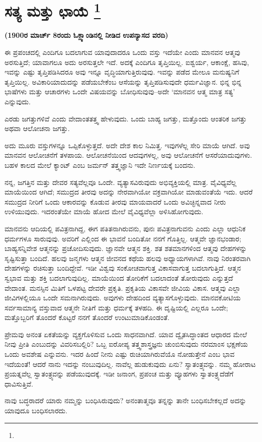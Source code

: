 
\chapter[ಸತ್ಯ ಮತ್ತು ಛಾಯೆ ]{ಸತ್ಯ ಮತ್ತು ಛಾಯೆ \protect\footnote{}}

\centerline{\textbf{(1900ರ ಮಾರ್ಚ್​ 8ರಂದು ಓಕ್ಲ್ಯಾಂಡಿನಲ್ಲಿ ನೀಡಿದ ಉಪನ್ಯಾಸದ ವರದಿ)}}

ಈ ಪ್ರಪಂಚದಲ್ಲಿ ಎಂದಿಗೂ ಬದಲಾಗುವ ಯಾವುದಾದರೂ ಒಂದು ವಸ್ತು ಇದೆಯೇ ಎಂದು ಮಾನವನ ಆತ್ಮವು ಅರಸುತ್ತಿದೆ; ಯಾವಾಗಲೂ ಅದು ಅರಸುತ್ತಲೇ ಇದೆ. ಅದಕ್ಕೆ ಎಂದಿಗೂ ತೃಪ್ತಿಯಿಲ್ಲ. ಐಶ್ವರ್ಯ, ಆಕಾಂಕ್ಷೆ, ಹಸಿವು, ಇವನ್ನು ಎಷ್ಟು ತೃಪ್ತಿಪಡಿಸಿದರೂ ಅವು ಇನ್ನೂ ವೃದ್ಧಿಯಾಗುತ್ತಿರುವುವು. ಇವನ್ನು ಪಡೆದ ಮೇಲೂ ಮನುಷ್ಯನಿಗೆ ತೃಪ್ತಿಯಿಲ್ಲ. ಅವಿಕಾರಿಯಾದುದನ್ನು ಪಡೆಯಬೇಕೆಂಬ ಆಸೆಯನ್ನು ತೃಪ್ತಿಪಡಿಸುವುದೇ ಧರ್ಮವಿಜ್ಞಾನ. ಭಿನ್ನ ಭಿನ್ನ ಭಾಷೆಗಳು ಮತ್ತು ಆಚಾರಗಳು ಒಂದೇ ವಿಷಯವನ್ನು ಬೋಧಿಸುವುವು–ಅದೇ ‘ಮಾನವನ ಆತ್ಮ ಮಾತ್ರ ಸತ್ಯ’ ಎನ್ನುವುದು.

ಎರಡು ಜಗತ್ತುಗಳಿವೆ ಎಂದು ವೇದಾಂತತತ್ತ್ವ ಹೇಳುವುದು. ಒಂದು ಬಾಹ್ಯ ಜಗತ್ತು, ಮತ್ತೊಂದು ಆಂತರಿಕ ಜಗತ್ತು ಅಥವಾ ಆಲೋಚನಾ ಜಗತ್ತು.

ಅದು ಮೂರು ವಸ್ತುಗಳನ್ನೂ ಒಪ್ಪಿಕೊಳ್ಳುತ್ತದೆ. ಅದೇ ದೇಶ ಕಾಲ ನಿಮಿತ್ತ. ಇವುಗಳೆಲ್ಲ ಸೇರಿ ಮಾಯೆ ಆಗಿದೆ. ಅವು ಮಾನವನ ಆಲೋಚನೆಗೆ ತಳಪಾಯ. ಆಲೋಚನೆಯಿಂದ ಆದವುಗಳಲ್ಲ, ಅವು ಆಲೋಚನೆಗೆ ಆಸರೆಯಾದುವುಗಳು. ಬಹಳ ಕಾಲದ ಮೇಲೆ ಕ್ಯಾಂಟ್​ ಎಂಬ ಜರ್ಮನ್​ ತತ್ತ್ವಜ್ಞಾನಿ ಇದೇ ನಿರ್ಣಯಕ್ಕೆ ಬಂದನು.

ನನ್ನ, ಜಗತ್ತಿನ ಮತ್ತು ದೇವರ ಸತ್ಯವೆಲ್ಲವೂ ಒಂದೇ. ವ್ಯತ್ಯಾಸವಿರುವುದು ಅಭಿವ್ಯಕ್ತಿಯಲ್ಲಿ ಮಾತ್ರ. ವೈವಿಧ್ಯವೆಲ್ಲ ಮಾಯೆಯಿಂದ ಆಗಿದೆ; ಸಮುದ್ರದ ತೀರವು ಅದನ್ನು ನೇರವಾಗಿಯೋ ವಕ್ರವಾಗಿಯೋ ಮಾಡುವಂತೆಯೆ ಇದು. ಆದರೆ ಸಮುದ್ರದ ನೀರಿಗೆ ಒಂದು ಆಕಾರವನ್ನು ಕೊಡುವ ತೀರವು ಮಾಯವಾದರೆ ಒಂದು ಅವಿಚ್ಛಿನ್ನವಾದ ನೀರು ಉಳಿಯುವುದು. ಇದರಂತೆಯೇ ಮಾಯೆ ಹೋದ ಮೇಲೆ ವೈವಿಧ್ಯವೆಲ್ಲಾ ಅಳಿಸಿ\break ಹೋಗುವುದು.

ಮಾನವನು ಆದಿಯಲ್ಲಿ ಪವಿತ್ರನಾಗಿದ್ದ, ಈಗ ಪತಿತನಾಗಿರುವನು, ಪುನಃ ಪವಿತ್ರನಾಗುವನು ಎಂದು ಎಲ್ಲಾ ಆಧುನಿಕ ಧರ್ಮಗಳೂ ಸಾರುವುವು. ಅವರಿಗೆ ಎಲ್ಲಿಂದ ಈ ಭಾವನೆ ಬಂದಿತೋ ನನಗೆ ಗೊತ್ತಿಲ್ಲ. ಆತ್ಮವೇ ಜ್ಞಾನಭಂಡಾರ; ಬಾಹ್ಯಸನ್ನಿವೇಶ ಆತ್ಮನನ್ನು ಪ್ರಚೋದಿಸುವುದು. ಜ್ಞಾನವೇ ಆತ್ಮನ ಶಕ್ತಿ. ಶತ ಶತಮಾನಗಳಿಂದ ಆತ್ಮವು ದೇಹಗಳನ್ನು ಸೃಷ್ಟಿಸುತ್ತಾ ಬಂದಿದೆ. ಹಲವು ಜನ್ಮಗಳು ಆತ್ಮನ ಜೀವನದ ಕಥೆಯ ಹಲವು ಅಧ್ಯಾಯಗಳಾಗಿವೆ. ನಾವು ನಿರಂತರವಾಗಿ ದೇಹಗಳನ್ನು ರಚಿಸುತ್ತಾ ಬಂದಿದ್ದೇವೆ. ಇಡೀ ವಿಶ್ವವು ಸಂಕೋಚವಾಗುತ್ತ ವಿಕಾಸವಾಗುತ್ತ ಬದಲಾಗುತ್ತಿದೆ. ಆತ್ಮನ ಸ್ವಭಾವ ಮತ್ತು ಶಕ್ತಿ ಬದಲಾಗುವುದಿಲ್ಲ. ಮಾಯೆಯಿಂದ ತೋರಿಕೆಗೆ ಬದಲಾದಂತೆ ತೋರುವುದು ಎನ್ನುತ್ತದೆ ವೇದಾಂತ. ಮನಸ್ಸಿನ ಮಿತಿಗೆ ಒಳಪಟ್ಟ ದೇವರೇ ಪ್ರಕೃತಿ. ಪ್ರಕೃತಿಯ ವಿಕಾಸವೇ ಜೀವಿಯ ವಿಕಾಸ. ಆತ್ಮವು ಎಲ್ಲಾ ಜೀವಿಗಳಲ್ಲಿಯೂ ಒಂದೇ ಸಮನಾಗಿರುವುದು. ಅವುಗಳು ದೇಹದಿಂದ ವ್ಯತ್ಯಾಸಗೊಳ್ಳುವುದು. ಮಾನವಕೋಟಿಯ ಸರ್ವಸಾಮಾನ್ಯ ವಸ್ತುವಾದ ಆತ್ಮನೇ ನೀತಿಗೆ ಮತ್ತು ಧರ್ಮಕ್ಕೆ ತಳಹದಿ. ಈ ದೃಷ್ಟಿಯಲ್ಲಿ ಎಲ್ಲರೂ ಒಂದೇ; ಮತ್ತೊಬ್ಬರಿಗೆ ತೊಂದರೆ ಕೊಟ್ಟರೆ ನನಗೆ ತೊಂದರೆ ಉಂಟುಮಾಡಿಕೊಂಡಂತೆ.

ಪ್ರೇಮವು ಅನಂತ ಏಕತೆಯನ್ನು ವ್ಯಕ್ತಗೊಳಿಸುವ ಒಂದು ಸಾಧನವಾಗಿದೆ. ಯಾವ ದ್ವೈತಸಿದ್ಧಾಂತದ ಆಧಾರದ ಮೇಲೆ ನೀವು ಪ್ರೀತಿ ಎಂಬುದನ್ನು ವಿವರಿಸಬಲ್ಲಿರಿ? ಒಬ್ಬ ಐರೋಪ್ಯ ತತ್ತ್ವಶಾಸ್ತ್ರಜ್ಞನು ಚುಂಬಿಸುವುದು ನರಮಾಂಸ ಭಕ್ಷಣೆಯ ಒಂದು ಅವಶೇಷ ಎನ್ನುವನು. ಇದರ ಹಿಂದೆ ನೀನು ಎಷ್ಟು ರುಚಿಯಾಗಿರುವೆಯೊ ನೋಡುತ್ತೇನೆ ಎಂಬ ಭಾವ ಇದೆಯಂತೆ! ಆದರೆ ನಾನು ಇದನ್ನು ನಂಬುವುದಿಲ್ಲ. ನಾವೆಲ್ಲ ಹುಡುಕುವುದು ಏನು? ಸ್ವಾತಂತ್ರ್ಯವನ್ನು. ನಮ್ಮ ಹೋರಾಟ ಪ್ರಯತ್ನವೆಲ್ಲ ಸ್ವಾತಂತ್ರ್ಯವನ್ನು ಪಡೆಯುವುದಕ್ಕೆ. ಇಡೀ ಜನಾಂಗ, ಪ್ರಪಂಚ ಮತ್ತು ವ್ಯೂಹಗಳು ಸ್ವಾತಂತ್ರ್ಯದೆಡೆಗೆ ಧಾವಿಸುತ್ತಿವೆ.

ನಾವು ಬದ್ಧರಾದರೆ ಯಾರು ನಮ್ಮನ್ನು ಬಂಧಿಸಿರುವುದು? ಅನಂತಾತ್ಮವೂ ತನ್ನನ್ನು ತಾನೇ ಬಂಧಿಸಬೇಕಲ್ಲದೆ ಅದನ್ನು ಯಾವುದೂ ಬಂಧಿಸಲಾರದು.

